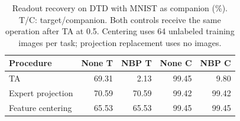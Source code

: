 \begin{table}[!htbp]
\centering
\small
\setlength{\tabcolsep}{2pt}
\caption{Readout recovery on DTD with MNIST as companion (\%). T/C: target/companion. Both controls receive the same operation after TA at 0.5. Centering uses 64 unlabeled training images per task; projection replacement uses no images.}
\label{tab:readout-recovery}
\begin{tabular}{lrrrr}
\toprule
Procedure & None T & NBP T & None C & NBP C \\
\midrule
TA & 69.31 & 2.13 & 99.45 & 9.80 \\
Expert projection & 70.59 & 70.59 & 99.42 & 99.42 \\
Feature centering & 65.53 & 65.53 & 99.45 & 99.45 \\
\bottomrule
\end{tabular}
\end{table}
